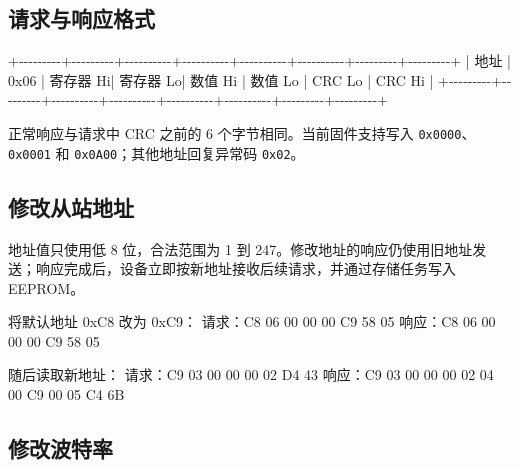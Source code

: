 \documentclass[
  chinese,
]{ctexart}
\newenvironment{Shaded}{}{}
\newcommand{\NormalTok}[1]{#1}
\begin{document}
\subsection{请求与响应格式}\label{ux8bf7ux6c42ux4e0eux54cdux5e94ux683cux5f0f}

\begin{Shaded}
\begin{Highlighting}[]
\NormalTok{+{-}{-}{-}{-}{-}{-}{-}{-}{-}+{-}{-}{-}{-}{-}{-}{-}{-}{-}+{-}{-}{-}{-}{-}{-}{-}{-}{-}{-}+{-}{-}{-}{-}{-}{-}{-}{-}{-}{-}+{-}{-}{-}{-}{-}{-}{-}{-}{-}{-}+{-}{-}{-}{-}{-}{-}{-}{-}{-}{-}+{-}{-}{-}{-}{-}{-}{-}{-}{-}+{-}{-}{-}{-}{-}{-}{-}{-}{-}+}
\NormalTok{| 地址    | 0x06    | 寄存器 Hi| 寄存器 Lo| 数值 Hi  | 数值 Lo  | CRC Lo  | CRC Hi  |}
\NormalTok{+{-}{-}{-}{-}{-}{-}{-}{-}{-}+{-}{-}{-}{-}{-}{-}{-}{-}{-}+{-}{-}{-}{-}{-}{-}{-}{-}{-}{-}+{-}{-}{-}{-}{-}{-}{-}{-}{-}{-}+{-}{-}{-}{-}{-}{-}{-}{-}{-}{-}+{-}{-}{-}{-}{-}{-}{-}{-}{-}{-}+{-}{-}{-}{-}{-}{-}{-}{-}{-}+{-}{-}{-}{-}{-}{-}{-}{-}{-}+}
\end{Highlighting}
\end{Shaded}

正常响应与请求中 CRC 之前的 6 个字节相同。当前固件支持写入
\texttt{0x0000}、\texttt{0x0001} 和 \texttt{0x0A00}；其他地址回复异常码
\texttt{0x02}。

\subsection{修改从站地址}\label{ux4feeux6539ux4eceux7ad9ux5730ux5740}

地址值只使用低 8 位，合法范围为 1 到
247。修改地址的响应仍使用旧地址发送；响应完成后，设备立即按新地址接收后续请求，并通过存储任务写入
EEPROM。

\begin{Shaded}
\begin{Highlighting}[]
\NormalTok{将默认地址 0xC8 改为 0xC9：}
\NormalTok{请求：C8 06 00 00 00 C9 58 05}
\NormalTok{响应：C8 06 00 00 00 C9 58 05}

\NormalTok{随后读取新地址：}
\NormalTok{请求：C9 03 00 00 00 02 D4 43}
\NormalTok{响应：C9 03 00 00 00 02 04 00 C9 00 05 C4 6B}
\end{Highlighting}
\end{Shaded}

\subsection{修改波特率}\label{ux4feeux6539ux6ce2ux7279ux7387}
\end{document}
